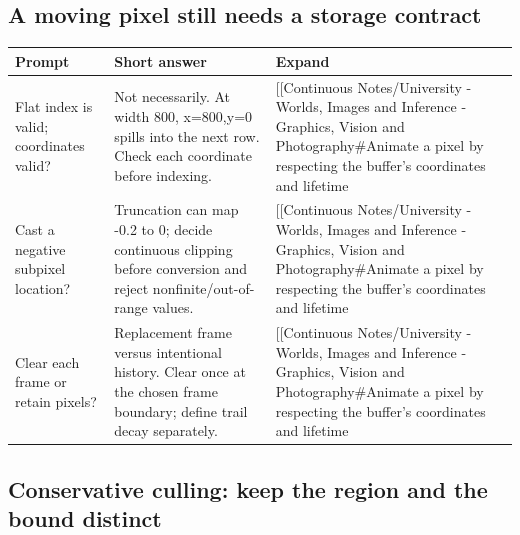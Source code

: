 \subsection{A moving pixel still needs a storage contract}\label{appendix-a8f634b076b5-a-moving-pixel-still-needs-a-storage-contract}

\hypertarget{appendix-a8f634b076b5-a-moving-pixel-still-needs-a-storage-contract}{}

{\def\LTcaptype{none} %
\begin{longtable}[]{@{}
  >{\raggedright\arraybackslash}p{}
  >{\raggedright\arraybackslash}p{}
  >{\raggedright\arraybackslash}p{}@{}}
\toprule\noalign{}
\begin{minipage}[b]{\linewidth}\raggedright
Prompt
\end{minipage} & \begin{minipage}[b]{\linewidth}\raggedright
Short answer
\end{minipage} & \begin{minipage}[b]{\linewidth}\raggedright
Expand
\end{minipage} \\
\midrule\noalign{}
\endhead
\bottomrule\noalign{}
\endlastfoot
Flat index is valid; coordinates valid? & Not necessarily. At width 800, x=800,y=0 spills into the next row. Check each coordinate before indexing. & {[}{[}Continuous Notes/University - Worlds, Images and Inference - Graphics, Vision and Photography\#Animate a pixel by respecting the buffer's coordinates and lifetime \\
Cast a negative subpixel location? & Truncation can map -0.2 to 0; decide continuous clipping before conversion and reject nonfinite/out-of-range values. & {[}{[}Continuous Notes/University - Worlds, Images and Inference - Graphics, Vision and Photography\#Animate a pixel by respecting the buffer's coordinates and lifetime \\
Clear each frame or retain pixels? & Replacement frame versus intentional history. Clear once at the chosen frame boundary; define trail decay separately. & {[}{[}Continuous Notes/University - Worlds, Images and Inference - Graphics, Vision and Photography\#Animate a pixel by respecting the buffer's coordinates and lifetime \\
\end{longtable}
}

\subsection{Conservative culling: keep the region and the bound distinct}\label{appendix-a8f634b076b5-conservative-culling-keep-the-region-and-the-bound-distinct}

